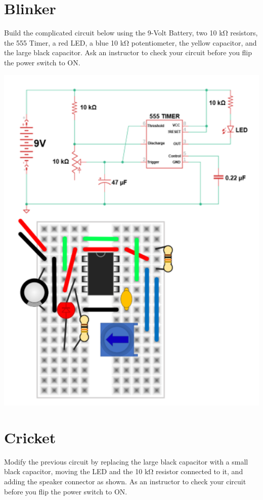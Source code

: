 \documentclass[
]{book}
\begin{document}
\hypertarget{blinker}{%
\chapter{Blinker}\label{blinker}}

Build the complicated circuit below using the 9-Volt Battery, two 10 kΩ resistors, the 555 Timer, a red LED, a blue 10 kΩ potentiometer, the yellow capacitor, and the large black capacitor.
Ask an instructor to check your circuit before you flip the power switch to ON.

\includegraphics[width=5.79in]{images/blinker_diagram}

\hypertarget{cricket}{%
\chapter{Cricket}\label{cricket}}

Modify the previous circuit by replacing the large black capacitor with a small black capacitor, moving the LED and the 10 kΩ resistor connected to it, and adding the speaker connector as shown.
As an instructor to check your circuit before you flip the power switch to ON.
\end{document}

